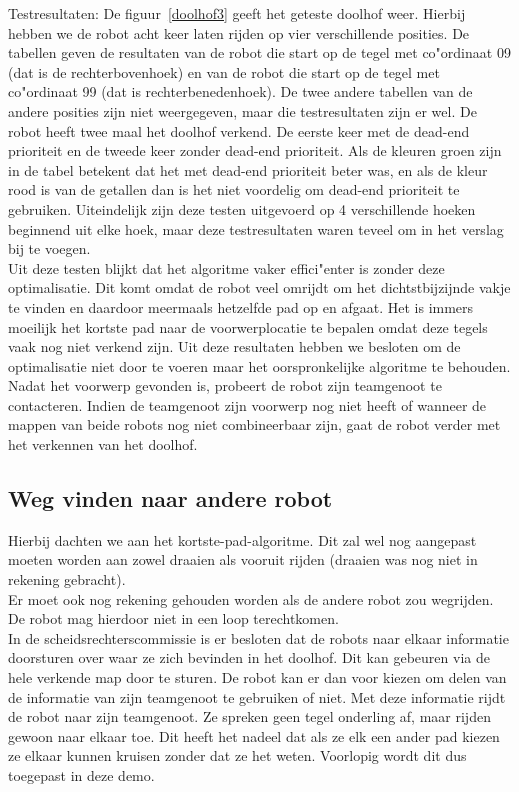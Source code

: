 \documentclass[tt2]{penoverslag}
\begin{document}
Testresultaten: De figuur~\ref{doolhof3} geeft het geteste doolhof weer. Hierbij hebben we de robot acht keer laten rijden op vier verschillende posities. De tabellen geven de resultaten van de robot die start op de tegel met co"ordinaat 09 (dat is de rechterbovenhoek) en van de robot die start op de tegel met co"ordinaat 99 (dat is rechterbenedenhoek). De twee andere tabellen van de andere posities zijn niet weergegeven, maar die testresultaten zijn er wel. De robot heeft twee maal het doolhof verkend. De eerste keer met de dead-end prioriteit en de tweede keer zonder dead-end prioriteit. Als de kleuren groen zijn in de tabel betekent dat het met dead-end prioriteit beter was, en als de kleur rood is van de getallen dan is het niet voordelig om dead-end prioriteit te gebruiken. Uiteindelijk zijn deze testen uitgevoerd op 4 verschillende hoeken beginnend uit elke hoek, maar deze testresultaten waren teveel om in het verslag bij te voegen.\\


Uit deze testen blijkt dat het algoritme vaker effici"enter is zonder deze optimalisatie. Dit komt omdat de robot veel omrijdt om het dichtstbijzijnde vakje te vinden en daardoor meermaals hetzelfde pad op en afgaat. Het is immers moeilijk het kortste pad naar de voorwerplocatie te bepalen omdat deze tegels vaak nog niet verkend zijn. Uit deze resultaten hebben we besloten om de optimalisatie niet door te voeren maar het oorspronkelijke algoritme te behouden. \\

Nadat het voorwerp gevonden is, probeert de robot zijn teamgenoot te contacteren. Indien de teamgenoot zijn voorwerp nog niet heeft of wanneer de mappen van beide robots nog niet combineerbaar zijn, gaat de robot verder met het verkennen van het doolhof. \\

\subsection{Weg vinden naar andere robot}
Hierbij dachten we aan het kortste-pad-algoritme. Dit zal wel nog aangepast moeten worden aan zowel draaien als vooruit rijden (draaien was nog niet in rekening gebracht).\\ Er moet ook nog rekening gehouden worden als de andere robot zou wegrijden. De robot mag hierdoor niet in een loop terechtkomen. \\

In de scheidsrechterscommissie is er besloten dat de robots naar elkaar informatie doorsturen over waar ze zich bevinden in het doolhof. Dit kan gebeuren via de hele verkende map door te sturen. De robot kan er dan voor kiezen om delen van de informatie van zijn teamgenoot te gebruiken of niet. Met deze informatie rijdt de robot naar zijn teamgenoot. Ze spreken geen tegel onderling af, maar rijden gewoon naar elkaar toe. Dit heeft het nadeel dat als ze elk een ander pad kiezen ze elkaar kunnen kruisen zonder dat ze het weten. Voorlopig wordt dit dus toegepast in deze demo.\\
\end{document}
